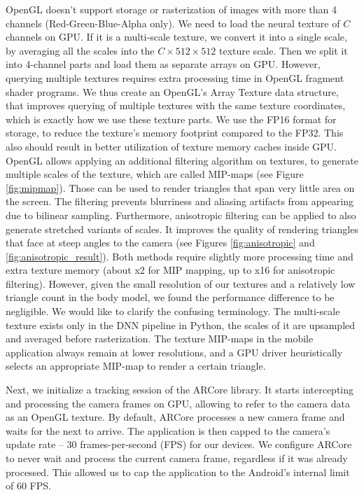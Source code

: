 OpenGL doesn't support storage or rasterization of images with more than 4 channels (Red-Green-Blue-Alpha only). We need to load the neural texture of $C$ channels on GPU. If it is a multi-scale texture, we convert it into a single scale, by averaging all the scales into the $C \times 512 \times 512$ texture scale. Then we split it into 4-channel parts and load them as separate arrays on GPU. However, querying multiple textures requires extra processing time in OpenGL fragment shader programs. We thus create an OpenGL's Array Texture data structure, that improves querying of multiple textures with the same texture coordinates, which is exactly how we use these texture parts. We use the FP16 format for storage, to reduce the texture's memory footprint compared to the FP32. This also should result in better utilization of texture memory caches inside GPU. OpenGL allows applying an additional filtering algorithm on textures, to generate multiple scales of the texture, which are called MIP-maps (see Figure \ref{fig:mipmap}). Those can be used to render triangles that span very little area on the screen. The filtering prevents blurriness and aliasing artifacts from appearing due to bilinear sampling. Furthermore, anisotropic filtering can be applied to also generate stretched variants of scales. It improves the quality of rendering triangles that face at steep angles to the camera (see Figures \ref{fig:anisotropic} and \ref{fig:anisotropic_result}). Both methods require slightly more processing time and extra texture memory (about x2 for MIP mapping, up to x16 for anisotropic filtering). However, given the small resolution of our textures and a relatively low triangle count in the body model, we found the performance difference to be negligible. We would like to clarify the confusing terminology. The multi-scale texture exists only in the DNN pipeline in Python, the scales of it are upsampled and averaged before rasterization. The texture  MIP-maps in the mobile application always remain at lower resolutions, and a GPU driver heuristically selects an appropriate MIP-map to render a certain triangle.

Next, we initialize a tracking session of the ARCore library. It starts intercepting and processing the camera frames on GPU, allowing to refer to the camera data as an OpenGL texture. By default, ARCore processes a new camera frame and waits for the next to arrive. The application is then capped to the camera's update rate -- 30 frames-per-second (FPS) for our devices. We configure ARCore to never wait and process the current camera frame, regardless if it was already processed. This allowed us to cap the application to the Android's internal limit of 60 FPS.

